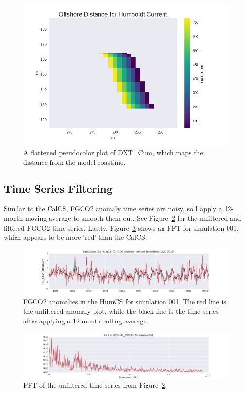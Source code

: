 \documentclass[12pt]{article}
\begin{document}
\begin{figure}[!h]
	\centering
	\includegraphics[width=29pc]{../../figs/humcs/study-site/humboldt-current-DXT-Cum.png}
	\caption{A flattened pseudocolor plot of DXT\_Cum, which maps the distance from the model coastline.}
	\label{fig:10}
\end{figure}

\subsection{Time Series Filtering}
Similar to the CalCS, FGCO2 anomaly time series are noisy, so I apply a 12-month moving average to smooth them out. See Figure~\ref{fig:11} for the unfiltered and filtered FGCO2 time series. Lastly, Figure~\ref{fig:12} shows an FFT for simulation 001, which appears to be more 'red' than the CalCS.
 \begin{figure}[!h]
 	\centering
 	\includegraphics[width=\linewidth]{../../figs/humcs/timeseries/hcs-filtered-fgco2-series-example.png}
 	\caption{FGCO2 anomalies in the HumCS for simulation 001. The red line is the unfiltered anomaly plot, while the black line is the time series after applying a 12-month rolling average.}
 	\label{fig:11}
 \end{figure}
 \begin{figure}[!h]
 	\centering
 	\includegraphics[width=\linewidth]{../../figs/humcs/fft/fft-HCS-001-frequencyHz.png}
 	\caption{FFT of the unfiltered time series from Figure~\ref{fig:11}.}
 	\label{fig:12}
 \end{figure}
\end{document}
